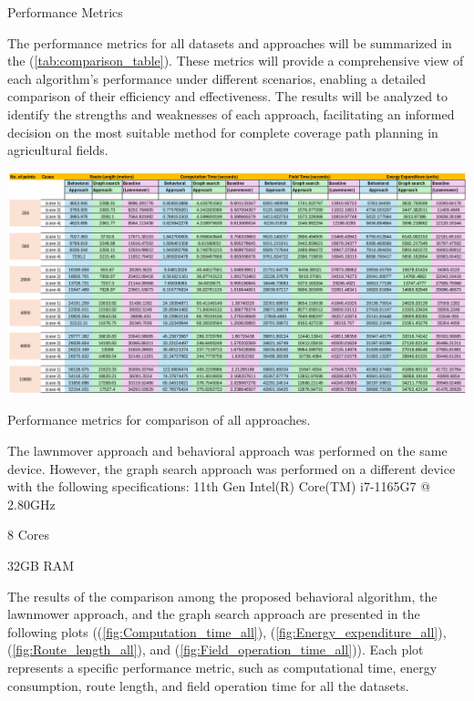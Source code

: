 \vspace*{6mm}   

Performance Metrics


The performance metrics for all datasets and approaches will be summarized in the (\autoref{tab:comparison_table}). These metrics will provide a comprehensive view of each algorithm's performance under different scenarios, enabling a detailed comparison of their efficiency and effectiveness. The results will be analyzed to identify the strengths and weaknesses of each approach, facilitating an informed decision on the most suitable method for complete coverage path planning in agricultural fields.


\begin{table}[htbp]
    \centering
    \includegraphics[width=\textwidth]{experimental_data/new_table_image.png}
    \caption{Performance metrics for comparison of all approaches.}
    \label{tab:comparison_table}
\end{table}


\vspace*{6mm}

The lawnmover approach and behavioral approach was performed on the same device. However, the graph search approach was performed on a different device with the following specifications:
11th Gen Intel(R) Core(TM) i7-1165G7 @ 2.80GHz

8 Cores

32GB RAM

\vspace*{6mm}



The results of the comparison among the proposed behavioral algorithm, the lawnmower approach, and the graph search approach are presented in the following plots ((\autoref{fig:Computation_time_all}), (\autoref{fig:Energy_expenditure_all}), (\autoref{fig:Route_length_all}), and (\autoref{fig:Field_operation_time_all})). Each plot represents a specific performance metric, such as computational time, energy consumption, route length, and field operation time for all the datasets. 

